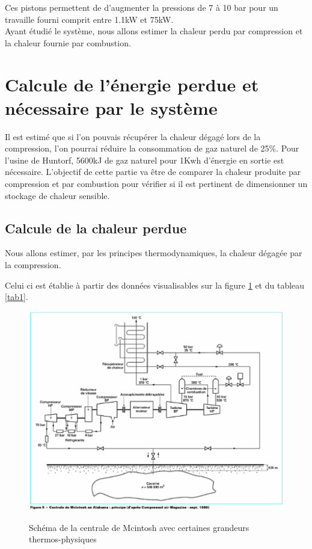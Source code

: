  Ces pistons permettent de d'augmenter la pressions de 7 à 10 bar pour un travaille fourni comprit entre 1.1kW et 75kW.\\
 
 Ayant étudié le système, nous allons estimer la chaleur perdu par compression et la chaleur fournie par combustion.
 
\section{Calcule de l'énergie perdue et nécessaire par le système}

Il est estimé que si l'on pouvais récupérer la chaleur dégagé lors de la compression, l'on pourrai réduire la consommation de gaz naturel de 25\%. Pour l'usine de Huntorf, 5600kJ de gaz naturel pour 1Kwh d'énergie en sortie est nécessaire. L'objectif de cette partie va être de comparer la chaleur produite par compression et par combustion pour vérifier si il est pertinent de dimensionner un stockage de chaleur sensible.


\subsection{Calcule de la chaleur perdue}

Nous allons estimer, par les principes thermodynamiques, la chaleur dégagée par la compression. 

Celui ci est établie à partir des données visualisables sur la figure \ref{sh_fonc} et du tableau \ref{tab1}.\\


\begin{figure}[!h]
\centering
\caption{Schéma de la centrale de Mcintosh avec certaines grandeurs thermos-physiques}
\includegraphics[scale=0.5]{PHOTO/shema_fonctionnement.jpg}
\label{sh_fonc}
\end{figure}


